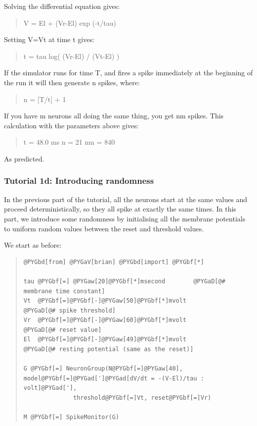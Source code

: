 \documentclass[letterpaper,10pt,english]{manual}
\begin{document}
Solving the differential equation gives:
\begin{quote}

V = El + (Vr-El) exp (-t/tau)
\end{quote}

Setting V=Vt at time t gives:
\begin{quote}

t = tau log( (Vr-El) / (Vt-El) )
\end{quote}

If the simulator runs for time T, and fires a spike immediately
at the beginning of the run it will then generate n spikes,
where:
\begin{quote}

n = {[}T/t{]} + 1
\end{quote}

If you have m neurons all doing the same thing, you get nm
spikes. This calculation with the parameters above gives:
\begin{quote}

t = 48.0 ms
n = 21
nm = 840
\end{quote}

As predicted.

\resetcurrentobjects
\hypertarget{--doc-tutorial_1d_introducing_randomness}{}

\subsubsection{Tutorial 1d: Introducing randomness}

In the previous part of the tutorial, all the neurons start
at the same values and proceed deterministically, so they all
spike at exactly the same times. In this part, we introduce
some randomness by initialising all the membrane potentials
to uniform random values between the reset and threshold
values.

We start as before:
\begin{quote}

\begin{Verbatim}[commandchars=@\[\]]
@PYGbd[from] @PYGaV[brian] @PYGbd[import] @PYGbf[*]

tau @PYGbf[=] @PYGaw[20]@PYGbf[*]msecond        @PYGaD[@# membrane time constant]
Vt  @PYGbf[=]@PYGbf[-]@PYGaw[50]@PYGbf[*]mvolt          @PYGaD[@# spike threshold]
Vr  @PYGbf[=]@PYGbf[-]@PYGaw[60]@PYGbf[*]mvolt          @PYGaD[@# reset value]
El  @PYGbf[=]@PYGbf[-]@PYGaw[49]@PYGbf[*]mvolt          @PYGaD[@# resting potential (same as the reset)]

G @PYGbf[=] NeuronGroup(N@PYGbf[=]@PYGaw[40], model@PYGbf[=]@PYGad[']@PYGad[dV/dt = -(V-El)/tau : volt]@PYGad['],
              threshold@PYGbf[=]Vt, reset@PYGbf[=]Vr)

M @PYGbf[=] SpikeMonitor(G)
\end{Verbatim}
\end{quote}
\end{document}
